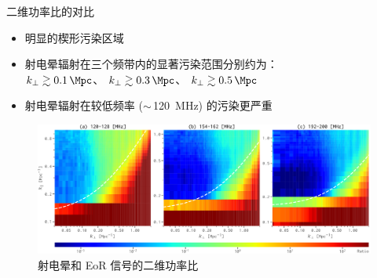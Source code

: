 \documentclass{beamer}
\begin{document}
\begin{frame}{二维功率比的对比}
  \begin{itemize}
    \item 明显的楔形污染区域
    \item 射电晕辐射在三个频带内的显著污染范围分别约为：\\
      $k_{\perp} \gtrsim \SI{0.1}{\per\Mpc}$、
      $k_{\perp} \gtrsim \SI{0.3}{\per\Mpc}$、
      $k_{\perp} \gtrsim \SI{0.5}{\per\Mpc}$
    \item 射电晕辐射在较低频率 ($\sim$\,\SI{120}{\MHz}) 的污染更严重
  \end{itemize}

  \begin{figure}
    \centering
    \includegraphics[width=\textwidth]{ps2d-ratio-3bands}
    \caption{射电晕和 EoR 信号的二维功率比}
  \end{figure}
\end{frame}
\end{document}
